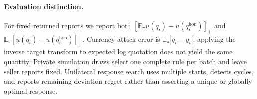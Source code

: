 \documentclass[10pt]{article}
\begin{document}
\paragraph{Evaluation distinction.}
For fixed returned reports we report both
$[\mathbb{E}_\pi u(q_i)-u(q_i^{\mathrm{hon}})]_+$ and
$\mathbb{E}_\pi[u(q_i)-u(q_i^{\mathrm{hon}})]_+$. Currency attack error is
$\mathbb{E}_\pi|q_i-y_i|$; applying the inverse target transform to expected
log quotation does not yield the same quantity. Private simulation draws
select one complete rule per batch and leave seller reports fixed. Unilateral
response search uses multiple starts, detects cycles, and reports remaining
deviation regret rather than asserting a unique or globally optimal response.
\end{document}
